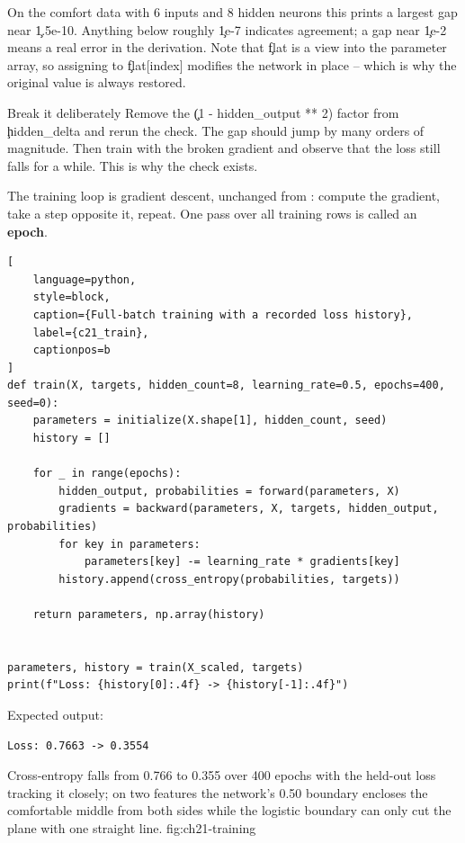 On the comfort data with 6 inputs and 8 hidden neurons this prints a largest gap
near \c{1.5e-10}. Anything below roughly \c{1e-7} indicates agreement; a gap near
\c{1e-2} means a real error in the derivation. Note that \c{flat} is a view into
the parameter array, so assigning to \c{flat[index]} modifies the network in
place -- which is why the original value is always restored.

\begin{TryBox}{Break it deliberately}
Remove the \c{(1 - hidden_output ** 2)} factor from \c{hidden_delta} and rerun
the check. The gap should jump by many orders of magnitude. Then train with the
broken gradient and observe that the loss still falls for a while. This is why
the check exists.
\end{TryBox}


The training loop is gradient descent, unchanged from
: compute the gradient, take a step opposite it,
repeat. One pass over all training rows is called an \textbf{epoch}.

\begin{lstlisting}[
    language=python,
    style=block,
    caption={Full-batch training with a recorded loss history},
    label={c21_train},
    captionpos=b
]
def train(X, targets, hidden_count=8, learning_rate=0.5, epochs=400, seed=0):
    parameters = initialize(X.shape[1], hidden_count, seed)
    history = []

    for _ in range(epochs):
        hidden_output, probabilities = forward(parameters, X)
        gradients = backward(parameters, X, targets, hidden_output, probabilities)
        for key in parameters:
            parameters[key] -= learning_rate * gradients[key]
        history.append(cross_entropy(probabilities, targets))

    return parameters, np.array(history)


parameters, history = train(X_scaled, targets)
print(f"Loss: {history[0]:.4f} -> {history[-1]:.4f}")
\end{lstlisting}

Expected output:

\begin{lstlisting}[language=text, style=block, caption={400 epochs of full-batch descent}, label={c21_train_output}, captionpos=b]
Loss: 0.7663 -> 0.3554
\end{lstlisting}

{Cross-entropy falls from 0.766 to 0.355 over 400 epochs with the held-out loss tracking it closely; on two features the network's 0.50 boundary encloses the comfortable middle from both sides while the logistic boundary can only cut the plane with one straight line.}
{fig:ch21-training}

